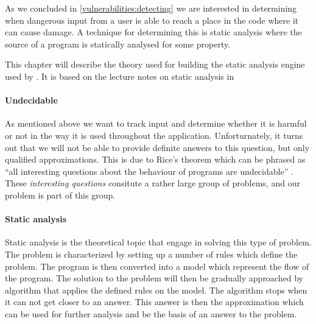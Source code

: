 As we concluded in \cref{vulnerabilities:detecting}  we are interested in determining when dangerous input from a user is able to reach a place in the code where it can cause damage.
A technique for determining this is static analysis where the source of a program is statically analysed for some property.

This chapter will describe the theory used for building the static analysis engine used by \pyt{}.
It is based on the lecture notes on static analysis in \citet{schwartzbach}

\paragraph{Undecidable}\label{theory_intro}
As mentioned above we want to track input and determine whether it is harmful or not in the way it is used throughout the application.
Unforturnately, it turns out that we will not be able to provide definite answers to this question, but only qualified approximations.
This is due to Rice's theorem which can be phrased as ``all interesting questions about the behaviour of programs are undecidable'' \citep[p.~3]{schwartzbach}.
These \emph{interesting questions} consitute a rather large group of problems, and our problem is part of this group.

\paragraph{Static analysis}
Static analysis is the theoretical topic that engage in solving this type of problem.
The problem is characterized by setting up a number of rules which define the problem.
The program is then converted into a model which represent the flow of the program.
The solution to the problem will then be gradually approached by algorithm that applies the defined rules on the model.
The algorithm stops when it can not get closer to an answer.
This answer is then the approximation which can be used for further analysis and be the basis of an answer to the problem.

